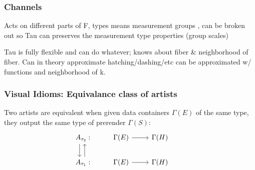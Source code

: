 \documentclass[../main.tex]{subfiles}
\begin{document}
\subsubsection{Channels}
Acts on different parts of F, types means measurement groups , can be broken out so 
Tau can preserves the measurement type properties (group scales)


Tau is fully flexible and can do whatever; knows about fiber \& neighborhood of fiber. Can in theory approximate hatching/dashing/etc can be approximated w/ functions and neighborhood of k. 


\subsubsection{Visual Idioms: Equivalance class of artists}
Two artists are equivalent when given data containers $\Gamma(E)$ of the same type, they output the same type of prerender $\Gamma(S)$:
\begin{equation}
    \begin{tikzcd}
        A_{\tau_2}: \arrow[d, shift right=2] & \Gamma(E) \arrow[r] & \Gamma(H) &                                                \\
        A_{\tau_1}: \arrow[u, shift right]   & \Gamma(E) \arrow[r] & \Gamma(H) 
    \end{tikzcd}
\end{equation}
\end{document}
